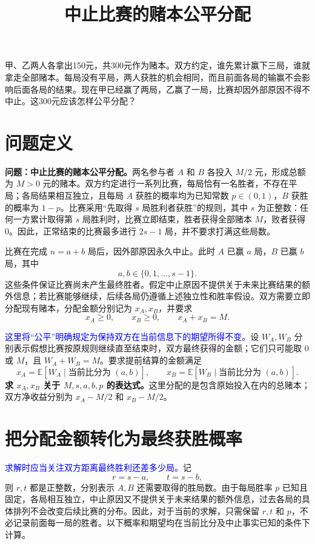 \documentclass[UTF8]{ctexart}
\title{中止比赛的赌本公平分配}
\author{}
\date{}
\begin{document}
\maketitle

甲、乙两人各拿出150元，共300元作为赌本。双方约定，谁先累计赢下三局，谁就拿走全部赌本。每局没有平局，两人获胜的机会相同，而且前面各局的输赢不会影响后面各局的结果。现在甲已经赢了两局，乙赢了一局，比赛却因外部原因不得不中止。这300元应该怎样公平分配？

\section{问题定义}
\label{sec:points-problem}

\textbf{问题：中止比赛的赌本公平分配。}两名参与者 \(A\) 和 \(B\) 各投入 \(M/2\) 元，形成总额为 \(M>0\) 元的赌本。双方约定进行一系列比赛，每局恰有一名胜者，不存在平局；各局结果相互独立，且每局 \(A\) 获胜的概率均为已知常数 \(p\in(0,1)\)，\(B\) 获胜的概率为 \(1-p\)。比赛采用“先取得 \(s\) 局胜利者获胜”的规则，其中 \(s\) 为正整数：任何一方累计取得第 \(s\) 局胜利时，比赛立即结束，胜者获得全部赌本 \(M\)，败者获得 \(0\)。因此，正常结束的比赛最多进行 \(2s-1\) 局，并不要求打满这些局数。

比赛在完成 \(n=a+b\) 局后，因外部原因永久中止。此时 \(A\) 已赢 \(a\) 局，\(B\) 已赢 \(b\) 局，其中
\[
a,b\in\{0,1,\ldots,s-1\}.
\]
这些条件保证比赛尚未产生最终胜者。假定中止原因不提供关于未来比赛结果的额外信息；若比赛能够继续，后续各局仍遵循上述独立性和胜率假设。双方需要立即分配现有赌本，分配金额分别记为 \(x_A,x_B\)，并要求
\[
x_A\ge 0,\qquad x_B\ge 0,\qquad x_A+x_B=M.
\]

\textcolor{blue}{这里将“公平”明确规定为保持双方在当前信息下的期望所得不变。}设 \(W_A,W_B\) 分别表示假想比赛按原规则继续直至结束时，双方最终获得的金额；它们只可能取 \(0\) 或 \(M\)，且 \(W_A+W_B=M\)。要求提前结算的金额满足
\[
x_A=\mathbb E[W_A\mid\text{当前比分为 }(a,b)],
\qquad
x_B=\mathbb E[W_B\mid\text{当前比分为 }(a,b)].
\]
\textbf{求 \(x_A,x_B\) 关于 \(M,s,a,b,p\) 的表达式。}这里分配的是包含原始投入在内的总赌本；双方净收益分别为 \(x_A-M/2\) 和 \(x_B-M/2\)。

\section{把分配金额转化为最终获胜概率}
\label{sec:points-reduction}

\textcolor{blue}{求解时应当关注双方距离最终胜利还差多少局。}记
\begin{equation}
  r=s-a,\qquad t=s-b,
  \label{eq:points-remaining}
\end{equation}
则 $r,t$ 都是正整数，分别表示 $A,B$ 还需要取得的胜局数。由于每局胜率 $p$ 已知且固定，各局相互独立，中止原因又不提供关于未来结果的额外信息，过去各局的具体排列不会改变后续比赛的分布。因此，对于当前的求解，只需保留 $r,t$ 和 $p$，不必记录前面每一局的胜者。以下概率和期望均在当前比分及中止事实已知的条件下计算。
\end{document}
